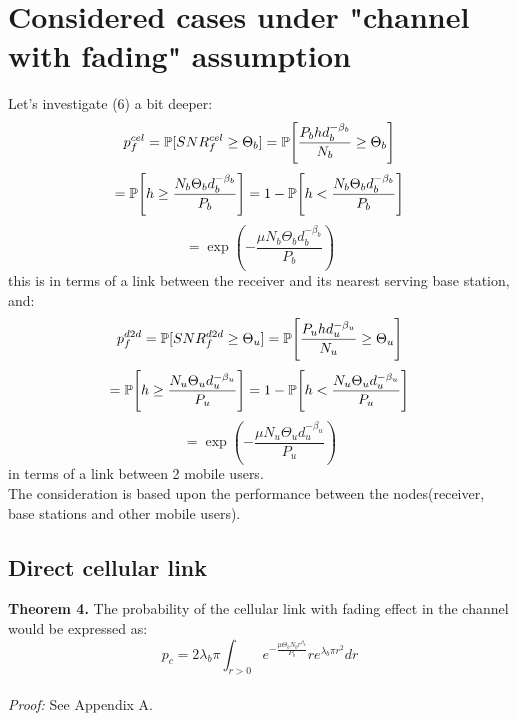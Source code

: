 \section{Considered cases under "channel with fading" assumption}
Let's investigate (6) a bit deeper:
\[p_f^{cel}=\P[SNR_f^{cel}\ge\Theta_b]=\P\Bigg[\frac {P_b h d_b^{-\beta_b}}{N_b}\ge\Theta_b\Bigg]\]
\[=\P\Bigg[h\ge\frac {N_b\Theta_b d_b^{-\beta_b}}{P_b}\Bigg]=1-\P\Bigg[h<\frac {N_b\Theta_b d_b^{-\beta_b}}{P_b}\Bigg]\]
\[=\exp(-\frac {\mu N_b\Theta_b d_b^{-\beta_b}}{P_b})\]
this is in terms of a link between the receiver and its nearest serving base station, and:
\[p_f^{d2d}=\P[SNR_f^{d2d}\ge\Theta_u]=\P\Bigg[\frac {P_u h d_u^{-\beta_u}}{N_u}\ge\Theta_u\Bigg]\]
\[=\P\Bigg[h\ge\frac {N_u\Theta_u d_u^{-\beta_u}}{P_u}\Bigg]=1-\P\Bigg[h<\frac {N_u\Theta_u d_u^{-\beta_u}}{P_u}\Bigg]\]
\[=\exp(-\frac {\mu N_u\Theta_u d_u^{-\beta_u}}{P_u})\]
in terms of a link between 2 mobile users.
\\The consideration is based upon the performance between the nodes(receiver, base stations and other mobile users).
  \subsection{Direct cellular link}
  \begin {framed}
	{\bf Theorem 4.}
    The probability of the cellular link with fading effect in the channel would be expressed as:
	$$p_c = 2\lambda_b\pi\int_{r>0}e^{-\frac{\mu\Theta_b N_b r^{\beta_b}}{P_b}}re^{\lambda_b\pi r^2}dr$$
	\\{\it Proof:}  See Appendix A.
  \end {framed}
